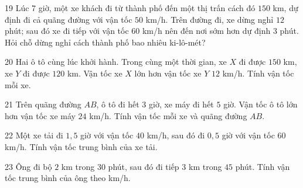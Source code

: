\gap
\begin{probbox}{19}{\relax}
Lúc 7 giờ, một xe khách đi từ thành phố đến một thị trấn cách đó $150$ km, dự định đi cả quãng đường với vận tốc $50$ km/h. Trên đường đi, xe dừng nghỉ $12$ phút; sau đó xe đi tiếp với vận tốc $60$ km/h nên đến nơi sớm hơn dự định $3$ phút. Hỏi chỗ dừng nghỉ cách thành phố bao nhiêu ki-lô-mét?
\end{probbox}
\gap
\begin{probbox}{20}{\relax}
Hai ô tô cùng lúc khởi hành. Trong cùng một thời gian, xe $X$ đi được $150$ km, xe $Y$ đi được $120$ km. Vận tốc xe $X$ lớn hơn vận tốc xe $Y$ $12$ km/h. Tính vận tốc mỗi xe.
\end{probbox}
\gap
\begin{probbox}{21}{\relax}
Trên quãng đường $AB$, ô tô đi hết $3$ giờ, xe máy đi hết $5$ giờ. Vận tốc ô tô lớn hơn vận tốc xe máy $24$ km/h. Tính vận tốc mỗi xe và quãng đường $AB$.
\end{probbox}
\gap
\begin{probbox}{22}{\relax}
Một xe tải đi $1{,}5$ giờ với vận tốc $40$ km/h, sau đó đi $0{,}5$ giờ với vận tốc $60$ km/h. Tính vận tốc trung bình của xe tải.
\end{probbox}
\gap
\begin{probbox}{23}{\relax}
Ông đi bộ $2$ km trong $30$ phút, sau đó đi tiếp $3$ km trong $45$ phút. Tính vận tốc trung bình của ông theo km/h.
\end{probbox}
